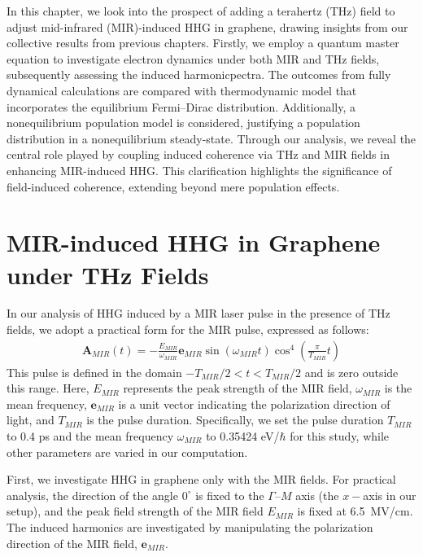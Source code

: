 In this chapter, we look into the prospect of adding a terahertz (THz) field to adjust mid-infrared (MIR)-induced \gls{HHG} in graphene, drawing insights from our collective results from previous chapters. Firstly, we employ a quantum master equation to investigate electron dynamics under both MIR and THz fields, subsequently assessing the induced harmonicpectra. The outcomes from fully dynamical calculations are compared with thermodynamic model that incorporates the equilibrium Fermi--Dirac distribution. Additionally, a nonequilibrium population model is considered, justifying a population distribution in a nonequilibrium steady-state. Through our analysis, we reveal the central role played by coupling induced coherence via THz and MIR fields in enhancing MIR-induced HHG. This clarification highlights the significance of field-induced coherence, extending beyond mere population effects.
\section{MIR-induced HHG in Graphene under THz Fields}

In our analysis of \gls{HHG} induced by a MIR laser pulse in the presence of THz fields, we adopt a practical form for the MIR pulse, expressed as follows:
\begin{align}
	\mathbf A_{MIR}(t) = -\frac{E_{MIR}}{\omega_{MIR}} \mathbf{e}_{MIR}
	\sin(\omega_{MIR} t) \cos^4 \left (\frac{\pi}{T_{MIR}} t \right)
	\label{eqn:laser_pulse}
\end{align}
This pulse is defined in the domain $-T_{MIR}/2<t<T_{MIR}/2$ and is zero outside this range.
Here, $E_{MIR}$ represents the peak strength of the MIR field, $\omega_{MIR}$ is the mean
frequency, $\mathbf e_{MIR}$ is a unit vector indicating the polarization direction of light, and
$T_{MIR}$ is the pulse duration. Specifically, we set the pulse duration $T_{MIR}$ to 0.4 ps and
the mean frequency $\omega_{MIR}$ to 0.35424 eV/$\hbar$ for this study, while other parameters are
varied in our computation.

First, we investigate HHG in graphene only with the MIR fields. For practical analysis, the
direction of the angle $0^\circ$ is fixed to the $\Gamma$--$M$ axis (the $x-$axis in our setup), and the peak field strength of the MIR field $E_{MIR}$ is fixed at 6.5~MV/cm. The induced harmonics are investigated by manipulating the polarization direction of the MIR field, $\mathbf e_{MIR}$.

